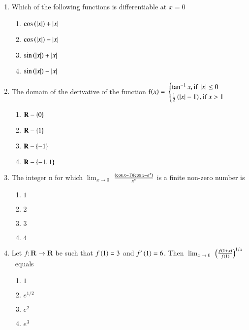 \documentclass[journal,12pt,onecolumn]{IEEEtran}
\theoremstyle{remark}
\begin{document}
\begin{enumerate}
\item %

	Which of the following functions is differentiable at $x=0$ \hfill{}
    \begin{enumerate}
	    \item $\cos\left(\left\vert x\right\vert\right)+\left\vert x\right\vert$
	    \item $\cos\left(\left\vert x\right\vert\right)-\left\vert x\right\vert$
	    \item $\sin\left(\left\vert x\right\vert\right)+\left\vert x\right\vert$
	    \item $\sin\left(\left\vert x\right\vert\right)-\left\vert x\right\vert$\\
    \end{enumerate}


\item %

    The domain of the derivative of the function
		f$\left(x\right)=$
 $\begin{cases}
	\tan^{-1}x, \text{if} \: \left\vert x\right\vert\leq0 \\
    	\frac{1}{2}\left(\left\vert x\right\vert-1\right), \text{if} \: x > 1 
\end{cases} $ \  \hfill{}
    \begin{enumerate}
	    \item $\mathbf{R}-\left\{0\right\}$
	    \item $\mathbf{R}-\left\{1\right\}$
	    \item $\mathbf{R}-\left\{-1\right\}$
	    \item $\mathbf{R}-\left\{-1,1\right\}$\\
    \end{enumerate}


\item %

	The integer n for which $\lim_{x \to 0}$ $\frac{\left(\cos x-1\right) \left(\cos x-e^{x}\right)}{x^{n}}$ is a finite non-zero number is \hfill{}
    \begin{enumerate}
     \item $1$
     \item $2$
     \item $3$
     \item $4$\\
    \end{enumerate}

\item %

	Let $f:\mathbf{R} \rightarrow \mathbf{R}$ be such that $f\left(1\right)=3$ and $f'\left(1\right)=6$. Then $\lim_{x \to 0}$ $ \left( \frac{f\left(1+x\right)}{f\left(1\right)}\right)^{1/x}$\ equals \hfill{}
    \begin{enumerate}
     \item $1$
     \item $e^{1/2}$
     \item $e^2$
     \item $e^3$\\
    \end{enumerate}



\end{enumerate}
\end{document}
